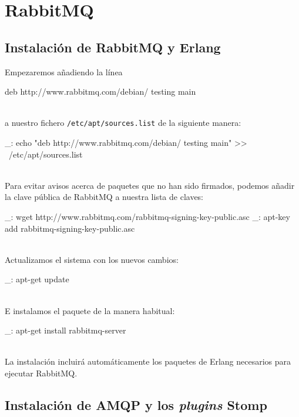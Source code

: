 \chapter{RabbitMQ}
\label{comun:rabbitmq}

\section{Instalación de RabbitMQ y Erlang}

Empezaremos añadiendo la línea

\begin{bashcode}
deb http://www.rabbitmq.com/debian/ testing main
\end{bashcode}
\\

a nuestro fichero \texttt{/etc/apt/sources.list} de la siguiente manera:

\begin{bashcode}
_: echo "deb http://www.rabbitmq.com/debian/ testing main" >> \
/etc/apt/sources.list
\end{bashcode}
\\

Para evitar avisos acerca de paquetes que no han sido firmados, podemos añadir la clave pública de RabbitMQ a nuestra lista de claves:

\begin{bashcode}
_: wget http://www.rabbitmq.com/rabbitmq-signing-key-public.asc
_: apt-key add rabbitmq-signing-key-public.asc
\end{bashcode}
\\

Actualizamos el sistema con los nuevos cambios:

\begin{bashcode}
_: apt-get update
\end{bashcode}
\\

E instalamos el paquete de la manera habitual:

\begin{bashcode}
_: apt-get install rabbitmq-server
\end{bashcode}
\\

La instalación incluirá automáticamente los paquetes de Erlang necesarios para ejecutar RabbitMQ.


\section{Instalación de AMQP y los \emph{plugins} Stomp}

